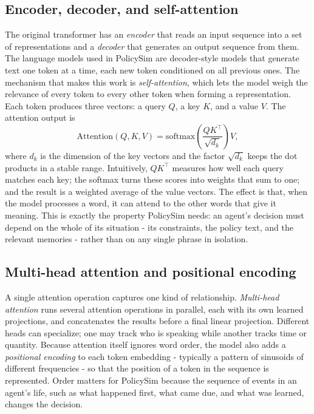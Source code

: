\documentclass[conference]{IEEEtran}
\begin{document}
\subsection{Encoder, decoder, and self-attention}
The original transformer has an \emph{encoder} that reads an input sequence into a set of representations and a \emph{decoder} that generates an output sequence from them. The language models used in PolicySim are decoder-style models that generate text one token at a time, each new token conditioned on all previous ones. The mechanism that makes this work is \emph{self-attention}, which lets the model weigh the relevance of every token to every other token when forming a representation. Each token produces three vectors: a query $Q$, a key $K$, and a value $V$. The attention output is
\begin{equation}
\mathrm{Attention}(Q,K,V) = \mathrm{softmax}\!\left(\frac{QK^{\top}}{\sqrt{d_k}}\right)V,
\end{equation}
where $d_k$ is the dimension of the key vectors and the factor $\sqrt{d_k}$ keeps the dot products in a stable range. Intuitively, $QK^{\top}$ measures how well each query matches each key; the softmax turns these scores into weights that sum to one; and the result is a weighted average of the value vectors. The effect is that, when the model processes a word, it can attend to the other words that give it meaning. This is exactly the property PolicySim needs: an agent's decision must depend on the whole of its situation - its constraints, the policy text, and the relevant memories - rather than on any single phrase in isolation.

\subsection{Multi-head attention and positional encoding}
A single attention operation captures one kind of relationship. \emph{Multi-head attention} runs several attention operations in parallel, each with its own learned projections, and concatenates the results before a final linear projection. Different heads can specialize; one may track who is speaking while another tracks time or quantity. Because attention itself ignores word order, the model also adds a \emph{positional encoding} to each token embedding - typically a pattern of sinusoids of different frequencies - so that the position of a token in the sequence is represented. Order matters for PolicySim because the sequence of events in an agent's life, such as what happened first, what came due, and what was learned, changes the decision.
\end{document}
